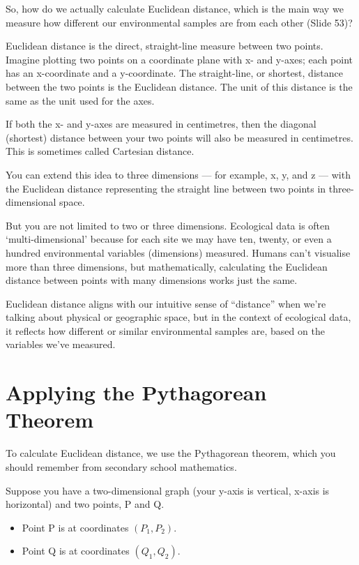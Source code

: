 \documentclass[
  10pt,
]{book}
\providecommand{\tightlist}{%
  \setlength{\itemsep}{0pt}\setlength{\parskip}{0pt}}
\begin{document}
So, how do we actually calculate Euclidean distance, which is the main
way we measure how different our environmental samples are from each
other (Slide 53)?

Euclidean distance is the direct, straight-line measure between two
points. Imagine plotting two points on a coordinate plane with x- and
y-axes; each point has an x-coordinate and a y-coordinate. The
straight-line, or shortest, distance between the two points is the
Euclidean distance. The unit of this distance is the same as the unit
used for the axes.

If both the x- and y-axes are measured in centimetres, then the diagonal
(shortest) distance between your two points will also be measured in
centimetres. This is sometimes called Cartesian distance.

You can extend this idea to three dimensions --- for example, x, y, and
z --- with the Euclidean distance representing the straight line between
two points in three-dimensional space.

But you are not limited to two or three dimensions. Ecological data is
often `multi-dimensional' because for each site we may have ten, twenty,
or even a hundred environmental variables (dimensions) measured. Humans
can't visualise more than three dimensions, but mathematically,
calculating the Euclidean distance between points with many dimensions
works just the same.

Euclidean distance aligns with our intuitive sense of ``distance'' when
we're talking about physical or geographic space, but in the context of
ecological data, it reflects how different or similar environmental
samples are, based on the variables we've measured.

\section{Applying the Pythagorean
Theorem}\label{applying-the-pythagorean-theorem}

To calculate Euclidean distance, we use the Pythagorean theorem, which
you should remember from secondary school mathematics.

Suppose you have a two-dimensional graph (your y-axis is vertical,
x-axis is horizontal) and two points, P and Q.

\begin{itemize}
\tightlist
\item
  Point P is at coordinates \((P_1, P_2)\).
\item
  Point Q is at coordinates \((Q_1, Q_2)\).
\end{itemize}
\end{document}
